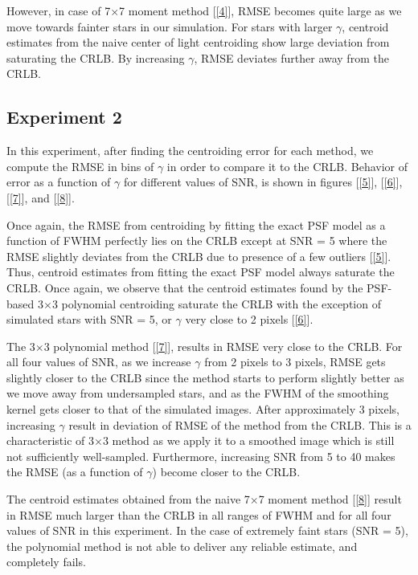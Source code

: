 \documentclass[12pt, preprint]{aastex}
\begin{document}
However, in case of 7$\times$7 moment method [\ref{4}], RMSE becomes
quite large as we move towards fainter stars in our simulation.
For stars with larger $\gamma$, centroid estimates from the naive center of light 
centroiding show large deviation from saturating the CRLB. By increasing $\gamma$,
RMSE deviates further away from the CRLB.

\subsection{Experiment 2}

In this experiment, after finding the centroiding error for each method, we
compute the RMSE in bins of $\gamma$ in order to compare it to the CRLB. 
Behavior of error as a function of $\gamma$ for different values of SNR,
is shown in figures [\ref{5}], [\ref{6}], [\ref{7}], and [\ref{8}]. 
 
Once again, the RMSE from centroiding by fitting the exact PSF model as a function of FWHM
perfectly lies on the CRLB except at SNR = 5 where the RMSE slightly deviates
from the CRLB due to presence of a few outliers [\ref{5}]. 
Thus, centroid estimates from fitting
the exact PSF model always saturate the CRLB. Once again, we observe that the centroid
estimates found by the PSF-based 3$\times$3 polynomial centroiding saturate the CRLB with the
exception of simulated stars with SNR = 5, or $\gamma$ very close to 2 pixels [\ref{6}].

The 3$\times$3 polynomial method [\ref{7}], results in RMSE very close to the CRLB.
For all four values of SNR, as we increase $\gamma$ from 2 pixels to 3 pixels,
RMSE gets slightly closer to the CRLB since the method starts to perform
slightly better as we move away from undersampled stars, and as the FWHM of the smoothing kernel
gets closer to that of the simulated images.
After approximately 3 pixels, increasing $\gamma$ result in deviation of RMSE of the method from the CRLB.
This is a characteristic of 3$\times$3 method as we apply it to a smoothed image which is still not sufficiently
well-sampled.  Furthermore, increasing SNR from 5 to 40 makes the RMSE (as a function of $\gamma$) become
closer to the CRLB.

The centroid estimates obtained from the naive 7$\times$7 moment method [\ref{8}]
result in RMSE much larger than the CRLB in all ranges of FWHM and for all four
values of SNR in this experiment. In the case of extremely faint stars (SNR = 5),
the polynomial method is not able to deliver any reliable estimate, and completely fails.
\end{document}
